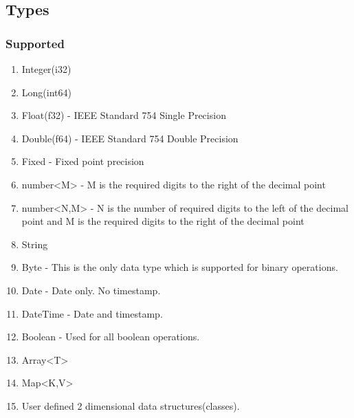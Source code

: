 \documentclass[hidelinks]{article}
\begin{document}
\subsection{Types}
\subsubsection{Supported}
\begin{enumerate}
\item Integer(i32)
\item Long(int64)
\item Float(f32) - IEEE Standard 754 Single Precision
\item Double(f64) - IEEE Standard 754 Double Precision
\item Fixed - Fixed point precision
\item number\textless{}M\textgreater{} - M is the required digits to the right of the decimal point
\item number\textless{}N,M\textgreater{} - N is the number of required digits to the left of the decimal point and M is the required digits to the right of the decimal point
\item String
\item Byte - This is the only data type which is supported for binary operations.
\item Date - Date only. No timestamp.
\item DateTime - Date and timestamp.
\item Boolean - Used for all boolean operations.
\item Array\textless{T}\textgreater
\item Map\textless{K,V}\textgreater
\item User defined 2 dimensional data structures(classes).
\end{enumerate}
\end{document}
